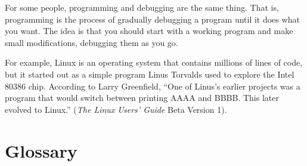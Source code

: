 \documentclass[10pt]{book}
\begin{document}
For some people, programming and debugging are the same thing.  That
is, programming is the process of gradually debugging a program until
it does what you want.  The idea is that you should start with a
working program and make small modifications,
debugging them as you go.

For example, Linux is an operating system that contains millions of
lines of code, but it started out as a simple program Linus Torvalds
used to explore the Intel 80386 chip.  According to Larry Greenfield,
``One of Linus's earlier projects was a program that would switch
between printing AAAA and BBBB.  This later evolved to Linux.''
({\em The Linux Users' Guide} Beta Version 1).


\section{Glossary}
\end{document}
